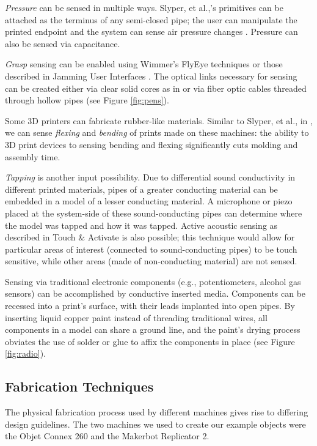 \emph{Pressure} can be sensed in multiple ways.  Slyper, et al.,'s primitives can be attached as the terminus of any semi-closed pipe; the user can manipulate the printed endpoint and the system can sense air pressure changes \cite{Slyper-pressure}.  Pressure can also be sensed via capacitance.

\emph{Grasp} sensing can be enabled using Wimmer's FlyEye techniques \cite{Wimmer-flyeye} or those described in Jamming User Interfaces \cite{Follmer-jamming}.  The optical links necessary for sensing can be created either via clear solid cores as in \cite{Willis-printedoptics} or via fiber optic cables threaded through hollow pipes (see Figure \ref{fig:pens}).

Some 3D printers can fabricate rubber-like materials.  Similar to Slyper, et al., in \cite{Slyper-shape}, we can sense \emph{flexing} and \emph{bending} of prints made on these machines: the ability to 3D print devices to sensing bending and flexing significantly cuts molding and assembly time.

\emph{Tapping} is another input possibility.  Due to differential sound conductivity in different printed materials, pipes of a greater conducting material can be embedded in a model of a lesser conducting material.  A microphone or piezo placed at the system-side of these sound-conducting pipes can determine where the model was tapped and how it was tapped.  Active acoustic sensing as described in Touch \& Activate \cite{Ono-touchandactivate} is also possible; this technique would allow for particular areas of interest (connected to sound-conducting pipes) to be touch sensitive, while other areas (made of non-conducting material) are not sensed.

Sensing via traditional electronic components (e.g., potentiometers, alcohol gas sensors) can be accomplished by conductive inserted media.  Components can be recessed into a print's surface, with their leads implanted into open pipes.  By inserting liquid copper paint instead of threading traditional wires, all components in a model can share a ground line, and the paint's drying process obviates the use of solder or glue to affix the components in place (see Figure \ref{fig:radio}).

\subsection{Fabrication Techniques}

The physical fabrication process used by different machines gives rise to differing design guidelines.  The two machines we used to create our example objects were the Objet Connex 260 and the Makerbot Replicator 2.

